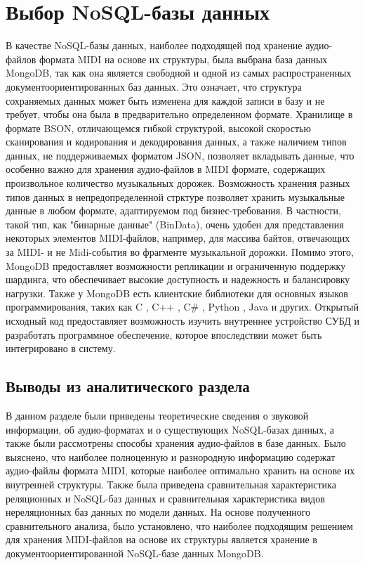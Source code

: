 \section{Выбор NoSQL-базы данных}

В качестве NoSQL-базы данных, наиболее подходящей под хранение аудио-файлов формата MIDI на основе их структуры, была выбрана база данных MongoDB, так как она является свободной и одной из самых распространенных документоориентированных баз данных. Это означает, что структура сохраняемых данных может быть изменена для каждой записи в базу и не требует, чтобы она была в предварительно определенном формате. Хранилище в формате BSON, отличающемся гибкой структурой, высокой скоростью сканирования и кодирования и декодирования данных, а также наличием типов данных, не поддерживаемых форматом JSON, позволяет вкладывать данные, что особенно важно для хранения аудио-файлов в MIDI формате, содержащих произвольное количество музыкальных дорожек. Возможность хранения разных типов данных в непредопределенной стрктуре позволяет хранить музыкальные данные в любом формате, адаптируемом под бизнес-требования. В частности, такой тип, как "бинарные данные" (BinData), очень удобен для представления некоторых элементов MIDI-файлов, например, для массива байтов, отвечающих за MIDI- и не Midi-события во фрагменте музыкальной дорожки. Помимо этого, MongoDB предоставляет возможности репликации и ограниченную поддержку шардинга, что обеспечивает высокие доступность и надежность и балансировку нагрузки. Также у MongoDB есть клиентские библиотеки для основных языков программирования, таких как C \cite{C}, C++ \cite{CPP}, C\# \cite{CS}, Python \cite{Python}, Java \cite{Java} и других. Открытый исходный код предоставляет возможность изучить внутреннее устройство СУБД и разработать программное обеспечение, которое впоследствии может быть интегрировано в систему.

\subsection{Выводы из аналитического раздела}

В данном разделе были приведены теоретические сведения о звуковой информации, об аудио-форматах и о существующих NoSQL-базах данных, а также были рассмотрены способы хранения аудио-файлов в базе данных. Было выяснено, что наиболее полноценную и разнородную информацию содержат аудио-файлы формата MIDI, которые наиболее оптимально хранить на основе их внутренней структуры. Также была приведена сравнительная характеристика реляционных и NoSQL-баз данных и сравнительная характеристика видов нереляционных баз данных по модели данных. На основе полученного сравнительного анализа, было установлено, что наиболее подходящим решением для хранения MIDI-файлов на основе их структуры является хранение в документоориентированной NoSQL-базе данных MongoDB.

\clearpage


